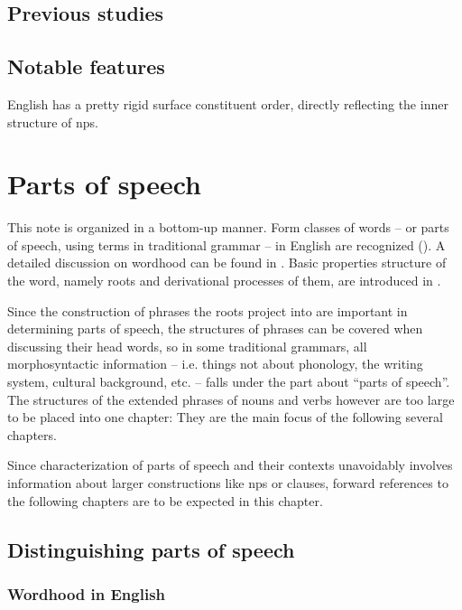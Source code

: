 \documentclass[UTF8, a4paper, oneside, scheme=plain, 12pt]{ctexbook}
\begin{document}
\section{Previous studies}

\section{Notable features}

English has a pretty rigid surface constituent order,
directly reflecting the inner structure of \acs{np}s.

\chapter{Parts of speech}


This note is organized in a bottom-up manner.
Form classes of words -- or parts of speech, using terms in traditional grammar -- in English
are recognized (). 
A detailed discussion on wordhood can be found in 
.
Basic properties structure of the word,
namely roots and derivational processes of them, 
are introduced in 
.



Since the construction of phrases the roots project into are important
in determining parts of speech, 
the structures of phrases can be covered when discussing their head words,
so in some traditional grammars,
all morphosyntactic information 
-- i.e. things not about phonology, the writing system, cultural background, etc. -- 
falls under the part about ``parts of speech''.
The structures of the extended phrases of nouns and verbs however are too large 
to be placed into one chapter:
They are the main focus of the following several chapters.

Since characterization of parts of speech and their contexts unavoidably involves 
information about larger constructions like \acs{np}s or clauses,
forward references to the following chapters are to be expected in this chapter.




\section{Distinguishing parts of speech}\label{sec:pos.find}

\subsection{Wordhood in English}\label{sec:pos.wordhood}
\end{document}
